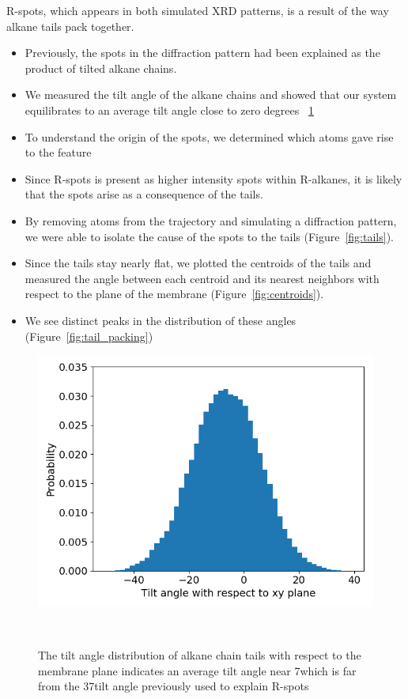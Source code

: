 \documentclass{article}
\begin{document}
  R-spots, which appears in both simulated XRD patterns, is a result of the way 
  alkane tails pack together.
  \begin{itemize}
  	\item Previously, the spots in the diffraction pattern had been explained 
	as the product of tilted alkane chains. %
	\item We measured the tilt angle of the alkane chains and showed that our 
	system equilibrates to an average tilt angle close to zero degrees ~\ref{fig:tilt} %
	\item To understand the origin of the spots, we determined which atoms gave rise to the feature
	\item Since R-spots is present as higher intensity spots within R-alkanes, it is likely
        that the spots arise as a consequence of the tails. 
	\item By removing atoms from the trajectory and simulating a diffraction 
	pattern, we were able to isolate the cause of the spots to the tails (Figure~\ref{fig:tails}).
	\item Since the tails stay nearly flat, we plotted the centroids of the 
	tails and measured the angle between each centroid and its nearest neighbors
	with respect to the plane of the membrane (Figure~\ref{fig:centroids}).
	\item We see distinct peaks in the distribution of these angles (Figure~\ref{fig:tail_packing})
  \end{itemize}

  \begin{figure}[ht]
  \centering
  \includegraphics[width=0.5\linewidth]{tilt_dist.png}
  \caption{The tilt angle distribution of alkane chain tails with respect to the membrane plane
  indicates an average tilt angle near 7\degree which is far from the 37\degree tilt angle 
  previously used to explain R-spots}~\label{fig:tilt}
  \end{figure}
\end{document}
